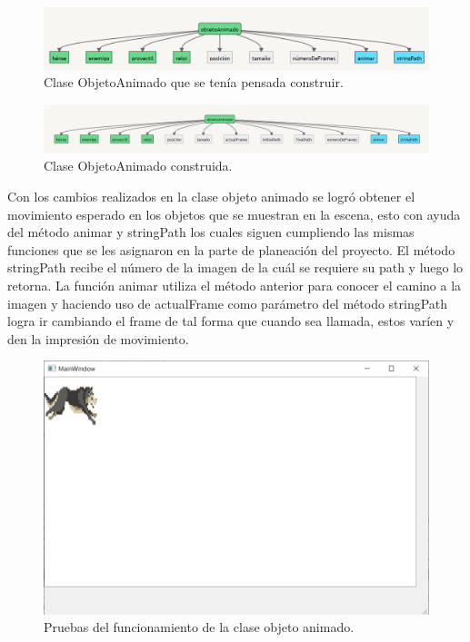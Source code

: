 \documentclass{article}
\begin{document}
\begin{figure}[h]
\includegraphics[scale=0.5]{Images/ObjetoAnimado.png}
\centering
\caption{Clase ObjetoAnimado que se tenía pensada construir.}
\label{fig:objetoAnimado}
\end{figure}

\begin{figure}[h]
\includegraphics[scale=0.6]{Images/newObjetoanimado.png}
\centering
\caption{Clase ObjetoAnimado construida.}
\label{fig:newobjetoAnimado}
\end{figure}

Con los cambios realizados en la clase objeto animado se logró obtener el movimiento esperado en los objetos que se muestran en la escena, esto con ayuda del método animar y stringPath los cuales siguen cumpliendo las mismas funciones que se les asignaron en la parte de planeación del proyecto. El método stringPath recibe el número de la imagen de la cuál se requiere su path y luego lo retorna. La función animar utiliza el método anterior para conocer el camino a la imagen y haciendo uso de actualFrame como parámetro del método stringPath logra ir cambiando el frame de tal forma que cuando sea llamada, estos varíen y den la impresión de movimiento.

\newpage
\begin{figure}[h]
\includegraphics[scale=0.6]{Images/animacionInicial.png}
\centering
\caption{Pruebas del funcionamiento de la clase objeto animado.}
\label{fig:animacion1}
\end{figure}
\end{document}
